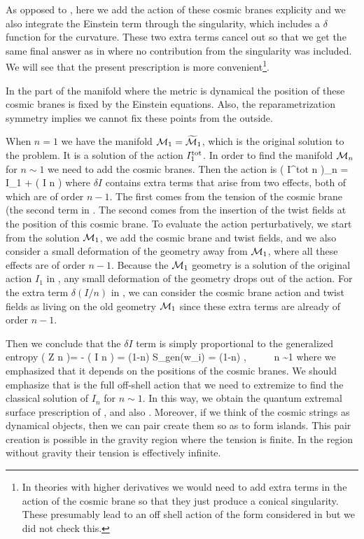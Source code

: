  \ee
 As opposed to \cite{Lewkowycz:2013nqa}, here we add the action of these cosmic branes explicity and we also integrate
 the Einstein term through the singularity, which includes a $\delta$ function for the curvature. These two extra terms cancel out so that we get the same final answer as in \cite{Lewkowycz:2013nqa} where no contribution from the singularity was included. We will see that the present prescription is more convenient\footnote{In theories with higher
 derivatives we would need to add extra terms in the action of the cosmic brane so that they just produce a conical singularity. These presumably lead to an off shell action of the form considered in \cite{Dong:2013qoa} but we did not check this.}.
 
 In the part of the manifold where the metric is dynamical the position of these cosmic branes is fixed by the Einstein equations. Also, the reparametrization symmetry implies we cannot fix these points from the outside. 
 
 When $n=1$ we have the manifold ${\cal M}_1 = \widetilde {\cal M}_1$, 
  which is the original solution to the problem. It is a solution of the action 
 $I^{\rm tot}_1$. In order to find the manifold ${\cal M}_n$ for $n\sim 1$ we need 
 to add the cosmic branes. Then the action  is 
 \be {}
  \left( {  I^{\rm tot} \over n } \right)_{n} = I_1 + \delta \left({ I \over n} \right)
 \ee
  where $\delta I$ contains  extra terms that arise from two effects, both of which are of order $n-1$. The first comes from the tension of the cosmic brane (the second term in . The second comes from the insertion of the twist fields at the position of this cosmic brane. To evaluate the action perturbatively, we start from the 
 solution ${\cal M}_1$, we add the cosmic brane and twist fields, and we also consider a small deformation of
 the geometry away from   ${\cal M}_1$, where all these effects are of order $n-1$. 
 Because the ${\cal M}_1$ geometry is a solution of the original action 
 $I_1$ in , any small deformation of the geometry drops out of the action. 
 For the extra term $\delta (I/n)$ in ,  we can consider the cosmic brane action 
 and twist fields as living on the old geometry ${\cal M}_1$ since these extra terms are already 
 of order $n-1$. 
 
 Then we conclude that  the  $\delta I$ term is simply proportional to the generalized entropy 
 \be  {}
 \delta \left( { \log Z \over n } \right)= -   \delta \left( {  I \over n } \right) = (1-n) S_{\rm gen}(w_i) = (1-n)  ,~~~ ~~n  \sim 1
 \ee
 where we emphasized that it depends on the positions of the cosmic branes. We should emphasize that  is the full off-shell action that we need to extremize  to find the classical solution of
 $I_n$ for $n \sim 1$. In this way, we obtain the quantum extremal surface prescription of \cite{Engelhardt:2014gca}, and also \cite{Ryu:2006bv,Hubeny:2007xt}.   Moreover, if we think of the cosmic strings as dynamical objects, then we can pair create them so as to form islands. This pair creation is possible in the gravity region where the tension is finite. In the region without gravity their tension is effectively infinite. 
 
